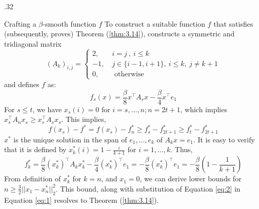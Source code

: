 \documentclass[final,t]{beamer}
\begin{document}
\begin{frame}[containsverbatim]
\begin{columns}[t]
\begin{column}{.32\linewidth}
    \begin{exampleblock}{Crafting a $\beta$-smooth function $f$}
      To construct a suitable function $f$ that satisfies (subsequently, proves) Theorem (\ref{thm:3.14}), \parencite{bubeck2015convex} constructs a symmetric and tridiagonal matrix
      \vspace{-2mm}
      \begin{equation*}
        (A_k)_{i,j} = \begin{cases}
          2, \ &i=j \ , \ i \leq k \\
          -1, \ &j \in \{i - 1, i + 1\}, \ i \leq k, \ j \neq k + 1 \\
          0, &\text{ otherwise}
        \end{cases}
      \end{equation*}
      \vspace{-2mm}
      and defines $f$ as:
      \vspace{-2mm}
      \begin{equation*}
        f_s(x) = \frac{\beta}{8}x^\top A_s x - \frac{\beta}{4}x^\top e_1
      \end{equation*}
      \vspace{-2mm}
      For $s \le t$, we have $x_s(i) = 0$ for $i = s,\ldots, n; n=2t+1$, which implies $x_s^\top A_{n} x_s \ge x_s^\top A_s x_s$. This implies,
      \vspace{-2mm}
      \begin{equation}\label{eq:1}
        f(x_s) - f^* = f(x_s) - f^*_{n} \geq f^*_s - f^*_{2t + 1} \geq f^*_t - f^*_{2t + 1}
      \end{equation}
      \vspace{-1mm}
      $x^*$ is the unique solution in the span of $e_1, \ldots , e_k$ of
      $A_k x = e_1$. It is easy to verify that it is defined by $x^*_k(i) = 1 - \frac{i}{k+1}$ for $i = 1, \ldots , k$. Thus,
      \vspace{-2mm}
      \begin{equation}\label{eq:2}
        f^*_k = \frac{\beta}{8}(x^*_k)^\top A_k x^*_k - \frac{\beta}{4}(x^*_k)^\top e_1 = - \frac{\beta}{8}(x^*_k)^\top e_1 = -\frac{\beta}{8} \left(1 - \frac{1}{k+1}\right)
      \end{equation}
      \vspace{-1mm}
      From definition of $x^*_k$ for $k=n$, and $x_1=0$, we can derive lower bounds for $n \ge \frac{3}{2}||x_1 - x^*_n||_2^2$.
      This bound, along with substitution of Equation \ref{eq:2} in Equation \ref{eq:1} resolves to Theorem (\ref{thm:3.14}).


\end{exampleblock}
\end{column}
\end{columns}
\end{frame}
\end{document}
